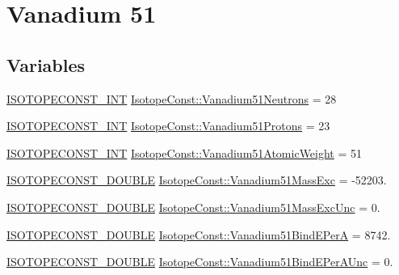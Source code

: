 \hypertarget{group___isotope_const-_vanadium-_v51}{}\section{Vanadium 51}
\label{group___isotope_const-_vanadium-_v51}
\subsection*{Variables}
\begin{DoxyCompactItemize}
\item 
\mbox{\hyperlink{group___isotope_const-_macros_ga5f18360b3e99483a35c32d789e62621c}{I\+S\+O\+T\+O\+P\+E\+C\+O\+N\+S\+T\+\_\+\+I\+NT}} \mbox{\hyperlink{group___isotope_const-_vanadium-_v51_ga3dff29d5be99c6a0ad5411d26c0d4984}{Isotope\+Const\+::\+Vanadium51\+Neutrons}} = 28
\item 
\mbox{\hyperlink{group___isotope_const-_macros_ga5f18360b3e99483a35c32d789e62621c}{I\+S\+O\+T\+O\+P\+E\+C\+O\+N\+S\+T\+\_\+\+I\+NT}} \mbox{\hyperlink{group___isotope_const-_vanadium-_v51_ga1b9d69af3a57746c555091cffdd4286b}{Isotope\+Const\+::\+Vanadium51\+Protons}} = 23
\item 
\mbox{\hyperlink{group___isotope_const-_macros_ga5f18360b3e99483a35c32d789e62621c}{I\+S\+O\+T\+O\+P\+E\+C\+O\+N\+S\+T\+\_\+\+I\+NT}} \mbox{\hyperlink{group___isotope_const-_vanadium-_v51_ga8dc37a40eecac2dd2a3170c313a720c2}{Isotope\+Const\+::\+Vanadium51\+Atomic\+Weight}} = 51
\item 
\mbox{\hyperlink{group___isotope_const-_macros_ga8f45a7272ce02c0b4c65c44636ed719a}{I\+S\+O\+T\+O\+P\+E\+C\+O\+N\+S\+T\+\_\+\+D\+O\+U\+B\+LE}} \mbox{\hyperlink{group___isotope_const-_vanadium-_v51_ga1694d8c46357282601208a6f4d531b9e}{Isotope\+Const\+::\+Vanadium51\+Mass\+Exc}} = -\/52203.
\item 
\mbox{\hyperlink{group___isotope_const-_macros_ga8f45a7272ce02c0b4c65c44636ed719a}{I\+S\+O\+T\+O\+P\+E\+C\+O\+N\+S\+T\+\_\+\+D\+O\+U\+B\+LE}} \mbox{\hyperlink{group___isotope_const-_vanadium-_v51_ga97cd13e901a417c61b196338488fe85a}{Isotope\+Const\+::\+Vanadium51\+Mass\+Exc\+Unc}} = 0.
\item 
\mbox{\hyperlink{group___isotope_const-_macros_ga8f45a7272ce02c0b4c65c44636ed719a}{I\+S\+O\+T\+O\+P\+E\+C\+O\+N\+S\+T\+\_\+\+D\+O\+U\+B\+LE}} \mbox{\hyperlink{group___isotope_const-_vanadium-_v51_gaa13df059097b1d35b0f03b711a8fdf40}{Isotope\+Const\+::\+Vanadium51\+Bind\+E\+PerA}} = 8742.
\item 
\mbox{\hyperlink{group___isotope_const-_macros_ga8f45a7272ce02c0b4c65c44636ed719a}{I\+S\+O\+T\+O\+P\+E\+C\+O\+N\+S\+T\+\_\+\+D\+O\+U\+B\+LE}} \mbox{\hyperlink{group___isotope_const-_vanadium-_v51_ga2b42965741dc03532b4fc45934270e0c}{Isotope\+Const\+::\+Vanadium51\+Bind\+E\+Per\+A\+Unc}} = 0.

\end{DoxyCompactItemize}

